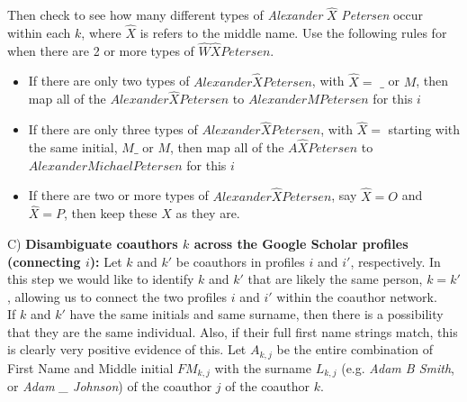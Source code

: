 
Then check to see how many different types of {\it Alexander} $\hat X$ {\it Petersen} occur within each $k$, where $\hat X$ is refers to the middle name. Use the following rules for when there are 2 or more types of $\hat W \hat X Petersen$.

 \begin{itemize}
 \item If there are only two  types of $Alexander \hat X Petersen$, with $\hat X=$ $\_$ or $M$, then map all of the $Alexander \hat X Petersen$ to $Alexander M Petersen$ for this $i$
 \item If there are only three types of $Alexander \hat X Petersen$, with $\hat X=$ starting with the same initial, $M\_$ or $M$, then map all of the $A\hat X Petersen$ to $Alexander Michael Petersen$ for this $i$
 \item If there are two or more types of $Alexander \hat X Petersen$, say $\hat X=O$ and $\hat X=P$, then keep these $X$ as they are.

\end{itemize}

C)  {\bf Disambiguate coauthors $k$ across the Google Scholar profiles (connecting $i$):} Let  $k$ and $k'$ be coauthors in profiles $i$ and $i'$, respectively.   In this step we would like to identify $k$ and $k'$ that are likely the same person, $k=k'$, allowing us to connect the two profiles $i$ and $i'$ within the coauthor network.\\

 If $k$ and $k'$ have the same initials and same surname, then there is a possibility that they are the same individual. Also, if their full first name strings match, this is clearly very positive evidence of this. Let $A_{k,j}$ be the entire combination of First Name and Middle initial $FM_{k,j}$ with the surname $L_{k,j}$ (e.g. {\it Adam B Smith}, or {\it Adam \_ Johnson}) of the coauthor $j$ of the coauthor $k$.

